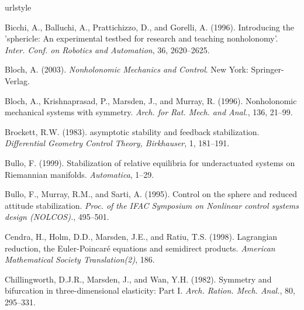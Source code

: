 \documentclass{ifacconf}
\begin{document}
\begin{thebibliography}{26}
\providecommand{\natexlab}[1]{#1}
\providecommand{\url}[1]{\texttt{#1}}
\providecommand{\urlprefix}{URL }
\expandafter\ifx\csname urlstyle\endcsname\relax
  \providecommand{\doi}[1]{doi:\discretionary{}{}{}#1}\else
  \providecommand{\doi}{doi:\discretionary{}{}{}\begingroup
  \urlstyle{rm}\Url}\fi

Bicchi, A., Balluchi, A., Prattichizzo, D., and Gorelli, A. (1996).
\newblock Introducing the 'sphericle: An experimental testbed for research and
  teaching nonholonomy'.
\newblock \emph{Inter. Conf. on Robotics and Automation}, 36, 2620--2625.

Bloch, A. (2003).
\newblock \emph{Nonholonomic Mechanics and Control}.
\newblock New York: Springer-Verlag.

Bloch, A., Krishnaprasad, P., Marsden, J., and Murray, R. (1996).
\newblock Nonholonomic mechanical systems with symmetry.
\newblock \emph{Arch. for Rat. Mech. and Anal.}, 136, 21--99.

Brockett, R.W. (1983).
\newblock asymptotic stability and feedback stabilization.
\newblock \emph{Differential {G}eometry {C}ontrol {T}heory, {B}irkhauser}, 1,
  181--191.

Bullo, F. (1999).
\newblock Stabilization of relative equilibria for underactuated systems on
  {R}iemannian manifolds.
\newblock \emph{Automatica}, 1--29.

Bullo, F., Murray, R.M., and Sarti, A. (1995).
\newblock Control on the sphere and reduced attitude stabilization.
\newblock \emph{Proc. of the {IFAC} Symposium on Nonlinear control systems
  design ({NOLCOS}).}, 495--501.

Cendra, H., Holm, D.D., Marsden, J.E., and Ratiu, T.S. (1998).
\newblock Lagrangian reduction, the {E}uler-{P}oincar\'{e} equations and
  semidirect products.
\newblock \emph{American Mathematical Society Translation(2)}, 186.

Chillingworth, D.J.R., Marsden, J., and Wan, Y.H. (1982).
\newblock Symmetry and bifurcation in three-dimensional elasticity: {P}art {I}.
\newblock \emph{{A}rch. {R}ation. {M}ech. {A}nal.}, 80, 295--331.


\end{thebibliography}
\end{document}

